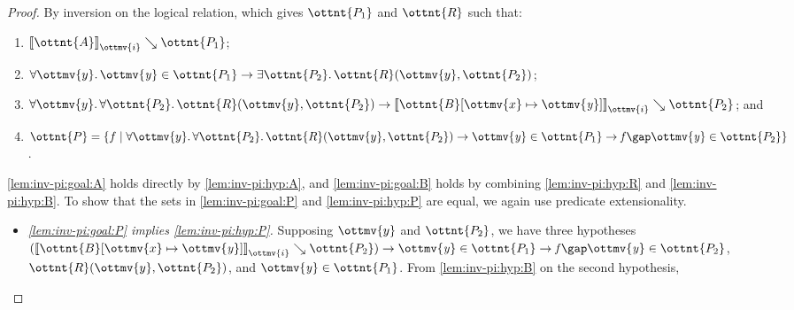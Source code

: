 \documentclass[a4paper,UKenglish,cleveref,autoref,thm-restate]{lipics-v2021}
\begin{document}
\begin{proof}
  By inversion on the logical relation,
  which gives $\ottnt{P_{{\mathrm{1}}}}$ and $\ottnt{R}$ such that:
  \begin{enumerate}[topsep=0pt,start=4]
    \item \label{lem:inv-pi:hyp:A} $ \mathopen{\llbracket}  \ottnt{A}  \mathclose{\rrbracket}_{ \ottmv{i} } \searrow  \ottnt{P_{{\mathrm{1}}}} $;
    \item \label{lem:inv-pi:hyp:R} $   \forall  \ottmv{y}  \mathpunct{.}   \mathit{ \ottmv{y} }    \in  \ottnt{P_{{\mathrm{1}}}}   \to   \exists  \ottnt{P_{{\mathrm{2}}}}  \mathpunct{.}   \ottnt{R} ( \ottmv{y} ,  \ottnt{P_{{\mathrm{2}}}} )   $;
    \item \label{lem:inv-pi:hyp:B} $  \forall  \ottmv{y}  \mathpunct{.}   \forall  \ottnt{P_{{\mathrm{2}}}}  \mathpunct{.}   \ottnt{R} ( \ottmv{y} ,  \ottnt{P_{{\mathrm{2}}}} )     \to   \mathopen{\llbracket}   \ottnt{B} [  \ottmv{x}  \mapsto   \mathit{ \ottmv{y} }   ]   \mathclose{\rrbracket}_{ \ottmv{i} } \searrow  \ottnt{P_{{\mathrm{2}}}}  $; and
    \item \label{lem:inv-pi:hyp:P} $\ottnt{P} =  \lbrace  f  \mid    \forall  \ottmv{y}  \mathpunct{.}   \forall  \ottnt{P_{{\mathrm{2}}}}  \mathpunct{.}   \ottnt{R} ( \ottmv{y} ,  \ottnt{P_{{\mathrm{2}}}} )     \to     \mathit{ \ottmv{y} }   \in  \ottnt{P_{{\mathrm{1}}}}   \to     \mathit{ f }   \gap   \mathit{ \ottmv{y} }    \in  \ottnt{P_{{\mathrm{2}}}}     \rbrace $.
  \end{enumerate}
  \ref{lem:inv-pi:goal:A} holds directly by \ref{lem:inv-pi:hyp:A},
  and \ref{lem:inv-pi:goal:B} holds by combining \ref{lem:inv-pi:hyp:R} and \ref{lem:inv-pi:hyp:B}.
  To show that the sets in \ref{lem:inv-pi:goal:P} and \ref{lem:inv-pi:hyp:P} are equal,
  we again use predicate extensionality.
  \begin{itemize}[topsep=0pt]
    \item \textit{\ref{lem:inv-pi:goal:P} implies \ref{lem:inv-pi:hyp:P}.}
      Supposing $\ottmv{y}$ and $\ottnt{P_{{\mathrm{2}}}}$,
      we have three hypotheses $   (  \mathopen{\llbracket}   \ottnt{B} [  \ottmv{x}  \mapsto   \mathit{ \ottmv{y} }   ]   \mathclose{\rrbracket}_{ \ottmv{i} } \searrow  \ottnt{P_{{\mathrm{2}}}}  )   \to    \mathit{ \ottmv{y} }   \in  \ottnt{P_{{\mathrm{1}}}}    \to     \mathit{ f }   \gap   \mathit{ \ottmv{y} }    \in  \ottnt{P_{{\mathrm{2}}}}  $,
      $ \ottnt{R} ( \ottmv{y} ,  \ottnt{P_{{\mathrm{2}}}} ) $, and $  \mathit{ \ottmv{y} }   \in  \ottnt{P_{{\mathrm{1}}}} $.
      From \ref{lem:inv-pi:hyp:B} on the second hypothesis,

\end{itemize}
\end{proof}
\end{document}
